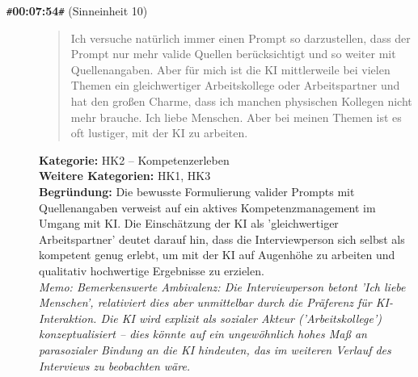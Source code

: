 \begin{description}
  \item[\texttt{\#}\textbf{00:07:54}\texttt{\#} (Sinneinheit 10)]
  \begin{quote}
  Ich versuche natürlich immer einen Prompt so darzustellen, dass der Prompt nur mehr valide Quellen berücksichtigt und so weiter mit Quellenangaben. Aber für mich ist die KI mittlerweile bei vielen Themen ein gleichwertiger Arbeitskollege oder Arbeitspartner und hat den großen Charme, dass ich manchen physischen Kollegen nicht mehr brauche. Ich liebe Menschen. Aber bei meinen Themen ist es oft lustiger, mit der KI zu arbeiten.
  \end{quote}
  \textbf{Kategorie:} HK2 -- Kompetenzerleben\\
  \textbf{Weitere Kategorien:} HK1, HK3\\
  \textbf{Begr\"undung:} Die bewusste Formulierung valider Prompts mit Quellenangaben verweist auf ein aktives Kompetenzmanagement im Umgang mit KI. Die Einschätzung der KI als 'gleichwertiger Arbeitspartner' deutet darauf hin, dass die Interviewperson sich selbst als kompetent genug erlebt, um mit der KI auf Augenhöhe zu arbeiten und qualitativ hochwertige Ergebnisse zu erzielen.
  \\\textit{Memo: Bemerkenswerte Ambivalenz: Die Interviewperson betont 'Ich liebe Menschen', relativiert dies aber unmittelbar durch die Präferenz für KI-Interaktion. Die KI wird explizit als sozialer Akteur ('Arbeitskollege') konzeptualisiert – dies könnte auf ein ungewöhnlich hohes Maß an parasozialer Bindung an die KI hindeuten, das im weiteren Verlauf des Interviews zu beobachten wäre.}
\end{description}
\medskip

